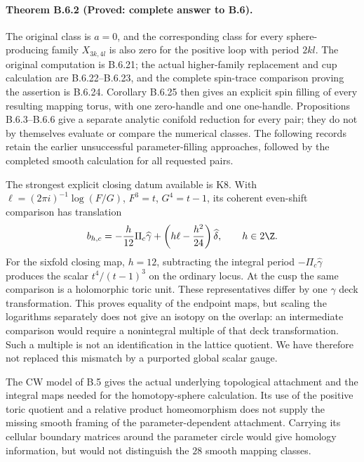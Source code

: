 \paragraph{Theorem B.6.2 (Proved: complete answer to B.6).}
The original class is $a=0$, and the corresponding class for
every sphere-producing family $X_{3k,4l}$ is also zero for
the positive loop with period $2kl$.  The original computation
is B.6.21; the actual higher-family replacement and cup
calculation are B.6.22--B.6.23, and the complete spin-trace
comparison proving the assertion is B.6.24.  Corollary B.6.25
then gives an explicit spin filling of every resulting
mapping torus, with one zero-handle and one one-handle.
Propositions B.6.3--B.6.6 give a separate analytic conifold
reduction for every pair; they do not by themselves evaluate
or compare the numerical classes.  The following records retain
the earlier unsuccessful parameter-filling approaches, followed
by the completed smooth calculation for all requested pairs.

The strongest explicit closing datum available is K8. With
$\ell=(2\pi i)^{-1}\log(F/G)$, $F^3=t$, $G^4=t-1$, its coherent
even-shift comparison has translation
\[
 b_{h,c}=-\frac h{12}\Pi_c\widehat\gamma+
          \left(h\ell-\frac{h^2}{24}\right)\widehat\delta,
 \qquad h\in2\Z.
\]
For the sixfold closing map, $h=12$, subtracting the integral period
$-\Pi_c\widehat\gamma$ produces the scalar $t^4/(t-1)^3$ on the
ordinary locus. At the cusp the same comparison is a holomorphic
toric unit. These representatives differ by one
$\widehat\gamma$ deck transformation. This proves equality of the
endpoint maps, but scaling the logarithms separately does not give
an isotopy on the overlap: an intermediate comparison would require
a nonintegral multiple of that deck transformation. Such a multiple
is not an identification in the lattice quotient. We have therefore
not replaced this mismatch by a purported global scalar gauge.

The CW model of B.5 gives the actual underlying topological attachment
and the integral maps needed for the homotopy-sphere calculation. Its
use of the positive toric quotient and a relative product
homeomorphism does not supply the missing smooth framing of the
parameter-dependent attachment. Carrying its cellular boundary
matrices around the parameter circle would give homology information,
but would not distinguish the $28$ smooth mapping classes.

